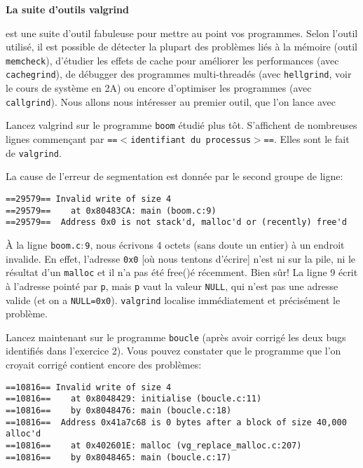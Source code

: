 \documentclass[10pt]{article}\usepackage[nu]{esial}
\begin{document}
\begin{Exercice}\textbf{La suite d'outils valgrind}
  
   est une suite d'outil fabuleuse pour mettre au point vos
  programmes. Selon l'outil utilisé, il est possible de détecter la plupart des
  problèmes liés à la mémoire (outil \texttt{memcheck}), d'étudier les effets
  de cache pour améliorer les performances (avec \texttt{cachegrind}), de
  débugger des programmes multi-threadés (avec \texttt{hellgrind}, voir le
  cours de système en 2A) ou encore d'optimiser les programmes (avec
  \texttt{callgrind}). Nous allons nous intéresser au premier outil, que l'on
  lance avec 

  \Question Lancez valgrind sur le programme \texttt{boom} étudié plus
  tôt. S'affichent de nombreuses lignes commençant par \texttt{==$<$identifiant
    du processus$>$==}. Elles sont le fait de \texttt{valgrind}.

  La cause de l'erreur de segmentation est donnée par le second groupe de
  ligne:
  \begin{Verbatim}
==29579== Invalid write of size 4
==29579==    at 0x80483CA: main (boom.c:9)
==29579==  Address 0x0 is not stack'd, malloc'd or (recently) free'd    
  \end{Verbatim}

  À la ligne \texttt{boom.c$:$9}, nous écrivons 4 octets (sans doute un entier)
  à un endroit invalide. En effet, l'adresse \texttt{0x0} [où nous tentons
  d'écrire] n'est ni sur la pile, ni le résultat d'un \texttt{malloc} et il n'a
  pas été free()é récemment. Bien sûr! La ligne 9 écrit à l'adresse pointé par
  \texttt{p}, mais \texttt{p} vaut la valeur \texttt{NULL}, qui n'est pas une
  adresse valide (et on a \texttt{NULL=0x0}). \texttt{valgrind} localise
  immédiatement et précisément le problème.

  \Question Lancez maintenant  sur le programme \texttt{boucle}
  (après avoir corrigé les deux bugs identifiés dans l'exercice 2). Vous pouvez
  constater que le programme que l'on croyait corrigé contient encore des
  problèmes:
  \begin{Verbatim}
==10816== Invalid write of size 4
==10816==    at 0x8048429: initialise (boucle.c:11)
==10816==    by 0x8048476: main (boucle.c:18)
==10816==  Address 0x41a7c68 is 0 bytes after a block of size 40,000 alloc'd
==10816==    at 0x402601E: malloc (vg_replace_malloc.c:207)
==10816==    by 0x8048465: main (boucle.c:17)    
  \end{Verbatim}


\end{Exercice}
\end{document}
